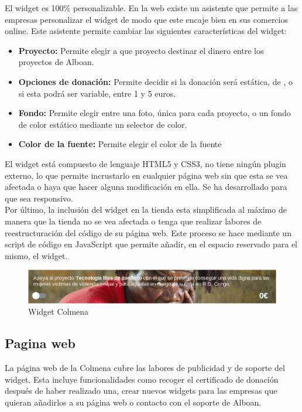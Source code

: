 El widget es 100\% personalizable. En la web existe un asistente que permite a las empresas personalizar el widget de modo que este encaje bien en sus comercios online. Este asistente permite cambiar las siguientes características del widget:

\begin{itemize}
	\item \textbf{Proyecto:} Permite elegir a que proyecto destinar el dinero entre los proyectos de Alboan.
	\item \textbf{Opciones de donación:} Permite decidir si la donación será estática, de , o si esta podrá ser variable, entre 1 y 5 euros.
	\item \textbf{Fondo:} Permite elegir entre una foto, única para cada proyecto, o un fondo de color estático mediante un selector de color.
	\item \textbf{Color de la fuente:} Permite elegir el color de la fuente
\end{itemize}

El widget está compuesto de lenguaje HTML5 y CSS3, no tiene ningún plugin externo, lo que permite incrustarlo en cualquier página web sin que esta se vea afectada o haya que hacer alguna modificación en ella. Se ha desarrollado para que sea responsivo.\\

Por último, la inclusión del widget en la tienda esta simplificada al máximo de manera que la tienda no se vea afectada o tenga que realizar labores de reestructuración del código de su página web. Este proceso se hace mediante un script de código en JavaScript que permite añadir, en el espacio reservado para el mismo, el widget.

\begin{figure}[h]
	\centering
	\includegraphics[width=1\textwidth]{imgs/widget.png}
	\caption {Widget Colmena}
	\label{widget}
\end{figure}



\subsection{Pagina web}

La página web de la Colmena cubre las labores de publicidad y de soporte del widget. Esta incluye funcionalidades como recoger el certificado de donación después de haber realizado una, crear nuevos widgets para las empresas que quieran añadirlos a su página web o contacto con el soporte de Alboan.\\

